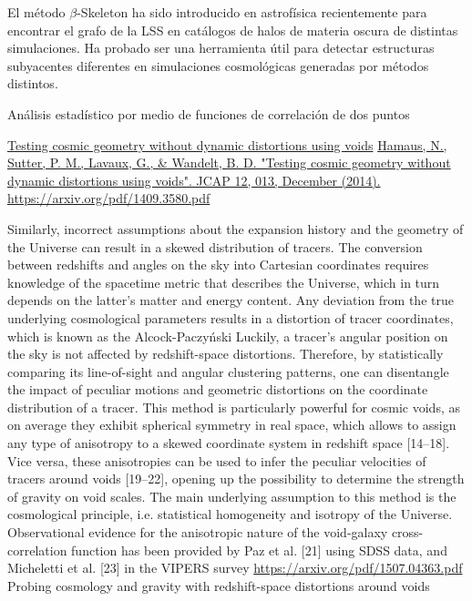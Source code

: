\documentclass[preprint]{aastex62}
\begin{document}
  El método $\beta$-Skeleton ha sido introducido en astrofísica recientemente \citep{Fang2018} para
  encontrar el grafo de la LSS en catálogos de halos de materia oscura de distintas simulaciones.
  Ha probado ser una herramienta útil para detectar estructuras subyacentes diferentes en
  simulaciones cosmológicas generadas por métodos distintos.

  Análisis estadístico por medio de funciones de correlación de dos puntos

  \url{Testing cosmic geometry without dynamic distortions using voids}
  \url{Hamaus, N., Sutter, P. M., Lavaux, G., & Wandelt, B. D. "Testing cosmic geometry without dynamic distortions using voids". JCAP 12, 013, December (2014). https://arxiv.org/pdf/1409.3580.pdf}



  Similarly, incorrect assumptions about the expansion history and the geometry of the
Universe can result in a skewed distribution of tracers. The conversion between redshifts and
angles on the sky into Cartesian coordinates requires knowledge of the spacetime metric that
describes the Universe, which in turn depends on the latter’s matter and energy content. Any
deviation from the true underlying cosmological parameters results in a distortion of tracer
coordinates, which is known as the Alcock-Paczy\'nski
Luckily, a tracer’s angular position on the sky is not affected by redshift-space distortions.
Therefore, by statistically comparing its line-of-sight and angular clustering patterns,
one can disentangle the impact of peculiar motions and geometric distortions on the coordinate
distribution of a tracer. This method is particularly powerful for cosmic voids, as
on average they exhibit spherical symmetry in real space, which allows to assign any type
of anisotropy to a skewed coordinate system in redshift space [14–18]. Vice versa, these
anisotropies can be used to infer the peculiar velocities of tracers around voids [19–22],
opening up the possibility to determine the strength of gravity on void scales. The main
underlying assumption to this method is the cosmological principle, i.e. statistical homogeneity
and isotropy of the Universe. Observational evidence for the anisotropic nature of
the void-galaxy cross-correlation function has been provided by Paz et al. [21] using SDSS
data, and Micheletti et al. [23] in the VIPERS survey
\url{https://arxiv.org/pdf/1507.04363.pdf}
Probing cosmology and gravity with
redshift-space distortions around voids

  
  
\end{document}
